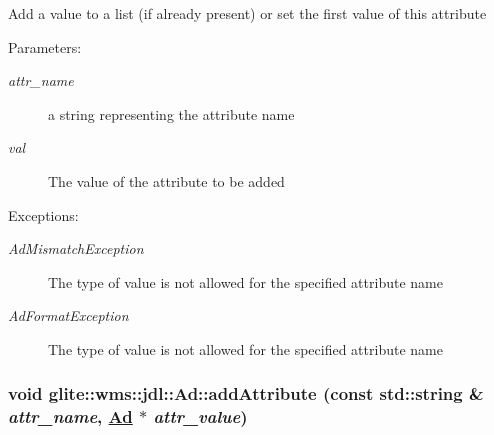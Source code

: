 Add a value to a list (if already present) or set the first value of this attribute \begin{Desc}
\item[Parameters:]
\begin{description}
\item[{\em attr\_\-name}]a string representing the attribute name \item[{\em val}]The value of the attribute to be added \end{description}
\end{Desc}
\begin{Desc}
\item[Exceptions:]
\begin{description}
\item[{\em Ad\-Mismatch\-Exception}]The type of value is not allowed for the specified attribute name \item[{\em Ad\-Format\-Exception}]The type of value is not allowed for the specified attribute name\end{description}
\end{Desc}
\hypertarget{classglite_1_1wms_1_1jdl_1_1Ad_z19_7}{
\subsubsection[addAttribute]{\setlength{\rightskip}{0pt plus 5cm}void glite::wms::jdl::Ad::add\-Attribute (const std::string \& {\em attr\_\-name}, \hyperlink{classglite_1_1wms_1_1jdl_1_1Ad}{Ad} $\ast$ {\em attr\_\-value})}}
\label{classglite_1_1wms_1_1jdl_1_1Ad_z19_7}


